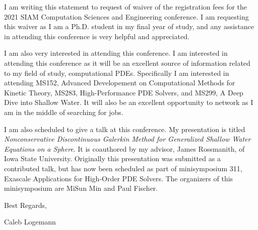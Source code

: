\documentclass[12pt]{article}
\begin{document}
  I am writing this statement to request of waiver of the registration fees for
  the 2021 SIAM Computation Sciences and Engineering conference.
  I am requesting this waiver as I am a Ph.D. student in my final year of study,
  and any assistance in attending this conference is very helpful and 
  appreciated.

  I am also very interested in attending this conference.
  I am interested in attending this conference as it will be an excellent source
  of information related to my field of study, computational PDEs.
  Specifically I am interested in attending MS152, Advanced Developement on 
  Computational Methods for Kinetic Theory, MS283, High-Performance PDE Solvers,
  and MS299, A Deep Dive into Shallow Water.
  It will also be an excellent opportunity to network as I am in the middle of
  searching for jobs.

  I am also scheduled to give a talk at this conference.
  My presentation is titled \emph{Nonconservative Discontinuous Galerkin Method 
  for Generalized Shallow Water Equations on a Sphere}.
  It is coauthored by my advisor, James Rossmanith, of Iowa State University.
  Originally this presentation was submitted as a contributed talk, but has now
  been scheduled as part of minisymposium 311, Exascale Applications for 
  High-Order PDE Solvers.
  The organizers of this minisymposium are MiSun Min and Paul Fischer.

  \vspace{0.5cm}

  \noindent Best Regards,

  \noindent Caleb Logemann
\end{document}
